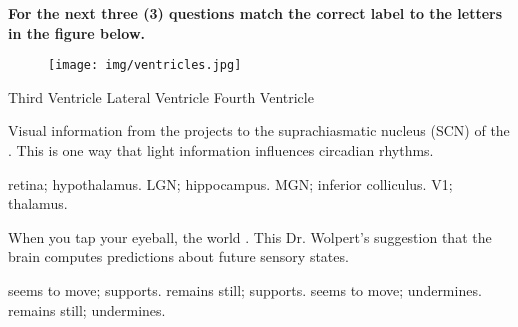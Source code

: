 \documentclass[answers]{exam}
\begin{document}
\begin{questions}
\vspace{.25in}

\textbf{For the next three (3) questions match the correct label to the letters in the figure below.}

\begin{figure}[h]
\texttt{[image: img/ventricles.jpg]}
\centering
\end{figure}

\question Third Ventricle
\question Lateral Ventricle
\question Fourth Ventricle

\newpage

\question Visual information from the \fillin projects to the suprachiasmatic nucleus (SCN) of the \fillin. This is one way that light information influences circadian rhythms.
\begin{choices}
\correctchoice retina; hypothalamus.
\choice LGN; hippocampus.
\choice MGN; inferior colliculus.
\choice V1; thalamus.
\end{choices}




\question When you tap your eyeball, the world \fillin. This \fillin Dr. Wolpert's suggestion that the brain computes predictions about future sensory states.
\begin{choices}
\correctchoice seems to move; supports.
\choice remains still; supports.
\choice seems to move; undermines.
\choice remains still; undermines.
\end{choices}


\end{questions}
\end{document}
